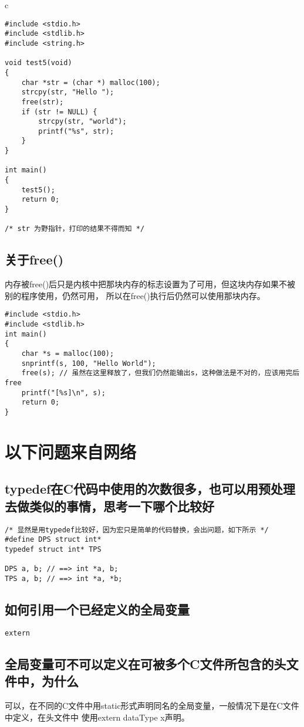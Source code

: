 \documentclass{article}
\begin{document}
\begin{mitned}{c}
\begin{verbatim}
#include <stdio.h>
#include <stdlib.h>
#include <string.h>

void test5(void)
{
	char *str = (char *) malloc(100);
	strcpy(str, "Hello ");
	free(str);
	if (str != NULL) {
		strcpy(str, "world");
		printf("%s", str);
	}
}

int main()
{
	test5();
	return 0;
}

/* str 为野指针，打印的结果不得而知 */
\end{verbatim}


\subsection{关于free()}
内存被free()后只是内核中把那块内存的标志设置为了可用，但这块内存如果不被别的程序使用，仍然可用，
所以在free()执行后仍然可以使用那块内存。


\begin{verbatim}
#include <stdio.h>
#include <stdlib.h>
int main()
{
	char *s = malloc(100);
	snprintf(s, 100, "Hello World");
	free(s); // 虽然在这里释放了，但我们仍然能输出s，这种做法是不对的，应该用完后free
	printf("[%s]\n", s);
	return 0;
}

\end{verbatim}
\section{以下问题来自网络}
\subsection{typedef在C代码中使用的次数很多，也可以用预处理去做类似的事情，思考一下哪个比较好}
\begin{verbatim}
/* 显然是用typedef比较好，因为宏只是简单的代码替换，会出问题，如下所示 */
#define DPS struct int*
typedef struct int* TPS

DPS a, b; // ==> int *a, b;
TPS a, b; // ==> int *a, *b;

\end{verbatim}

\subsection{如何引用一个已经定义的全局变量}
\begin{verbatim}
extern
\end{verbatim}


\subsection{全局变量可不可以定义在可被多个C文件所包含的头文件中，为什么}
可以，在不同的C文件中用static形式声明同名的全局变量，一般情况下是在C文件中定义，在头文件中
使用extern dataType x声明。


\end{mitned}
\end{document}
